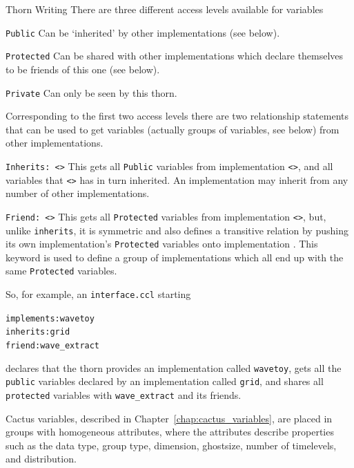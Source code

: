 \begin{cactuspart}{Thorn Writing}
There are three different access levels available for variables

\begin{Lentry}
\item[\texttt{Public}]
Can be `inherited' by other implementations (see below).
\item[\texttt{Protected}]
Can be shared with other implementations which declare themselves to
be friends of this one (see below).
\item[\texttt{Private}]
Can only be seen by this thorn.
\end{Lentry}

Corresponding to the first two access levels there are two relationship
statements that can be used to get variables (actually groups of variables,
see below) from other implementations.

\begin{Lentry}
\item [\texttt{Inherits: <\var{name}>}]
This gets all \texttt{Public} variables from implementation \texttt{<>}, and all
variables that \texttt{<>} has in turn inherited.
An implementation may inherit from any number of other implementations.
\item [\texttt{Friend: <\var{name}>}]
This gets all \texttt{Protected} variables from implementation \texttt{<>}, but,
unlike \texttt{inherits}, it is symmetric and also defines a transitive relation by
pushing its own implementation's \texttt{Protected} variables onto implementation
.  This keyword is used to define a group of implementations which
all end up with the same \texttt{Protected} variables.
\end{Lentry}

So, for example, an \texttt{interface.ccl} starting
\begin{alltt}
implements: wavetoy
inherits:   grid
friend:     wave_extract
\end{alltt}
declares that the thorn provides an implementation called \texttt{wavetoy}, gets
all the \texttt{public} variables declared by an implementation called \texttt{grid},
and shares all \texttt{protected} variables with \texttt{wave\_extract} and its
friends.

Cactus variables, described in Chapter~\ref{chap:cactus_variables}, are placed
in groups with homogeneous attributes, where
the attributes describe properties such as the data type, group type,
dimension, ghostsize, number of timelevels, and
distribution.


\end{cactuspart}
